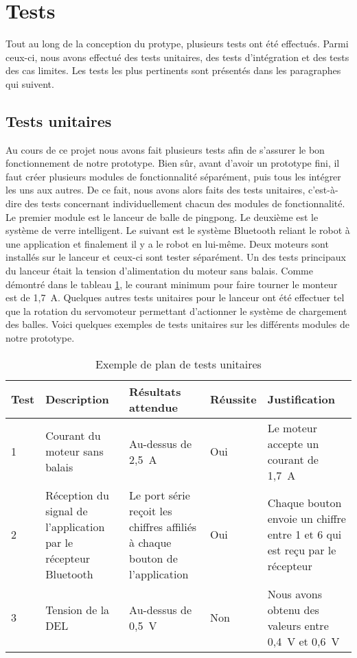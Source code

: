 \section{Tests}


Tout au long de la conception du protype, plusieurs tests ont été effectués.
Parmi ceux-ci, nous avons effectué des tests unitaires, des tests d'intégration et des tests des cas limites.
Les tests les plus pertinents sont présentés dans les paragraphes qui suivent.

\subsection{Tests unitaires}

Au cours de ce projet nous avons fait plusieurs tests afin de s’assurer le bon fonctionnement de notre prototype.
Bien sûr, avant d’avoir un prototype fini, il faut créer plusieurs modules de fonctionnalité séparément, puis tous les intégrer les uns aux autres.
De ce fait, nous avons alors faits des tests unitaires, c’est-à-dire des tests concernant individuellement chacun des modules de fonctionnalité.
Le premier module est le lanceur de balle de pingpong.
Le deuxième est le système de verre intelligent.
Le suivant est le système Bluetooth reliant le robot à une application et finalement il y a le robot en lui-même.
Deux moteurs sont installés sur le lanceur et ceux-ci sont tester séparément.
Un des tests principaux du lanceur était la tension d’alimentation du moteur sans balais.
Comme démontré dans le tableau \ref{tab:s3-test-unitaires}, le courant minimum pour faire tourner le monteur est de 1,7~A.
Quelques autres tests unitaires pour le lanceur ont été effectuer tel que la rotation du servomoteur permettant d’actionner le système de chargement des balles.
Voici quelques exemples de tests unitaires sur les différents modules de notre prototype.

\begin{table}[h!]
    \centering
    \begin{tabular}{p{0.25in}p{1.5in}p{1.5in}p{0.5in}p{1.5in}}
        \hline
        \bfseries Test & \bfseries Description & \bfseries Résultats attendue & \bfseries Réussite & \bfseries Justification \\
        \hline\hline
        1 & Courant du moteur sans balais & Au-dessus de 2,5~A & Oui & Le moteur accepte un courant de 1,7~A \\
        2 & Réception du signal de l’application par le récepteur Bluetooth & Le port série reçoit les chiffres affiliés à chaque bouton de l’application & Oui & Chaque bouton envoie un chiffre entre 1 et 6 qui est reçu par le récepteur \\
        3 & Tension de la DEL & Au-dessus de 0,5~V & Non & Nous avons obtenu des valeurs entre 0,4~V et 0,6~V \\
        \hline
    \end{tabular}
    \caption{Exemple de plan de tests unitaires}
    \label{tab:s3-test-unitaires}
\end{table}


